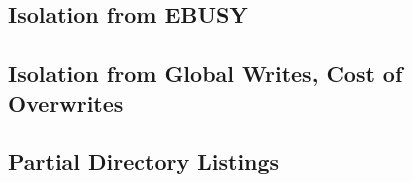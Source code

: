 %
%
%
%
%
%
%
%
%
%
%

\subsection{Isolation from EBUSY}
\subsection{Isolation from Global Writes, Cost of Overwrites}
\subsection{Partial Directory Listings}
